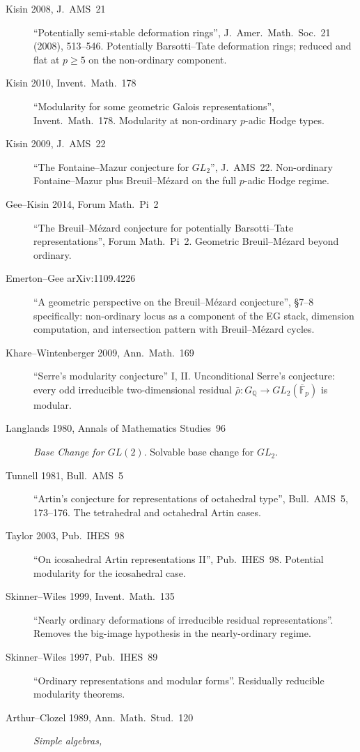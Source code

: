 \begin{description}
\item[Kisin 2008, J.~AMS~21] ``Potentially semi-stable deformation rings'',
J.~Amer.~Math.~Soc.~21 (2008), 513--546.
Potentially Barsotti--Tate deformation rings; reduced and flat at \(p\geq 5\) on
the non-ordinary component.
\item[Kisin 2010, Invent.~Math.~178] ``Modularity for some
geometric Galois representations'', Invent.~Math.~178. Modularity
at non-ordinary \(p\)-adic Hodge types.
\item[Kisin 2009, J.~AMS~22] ``The Fontaine--Mazur conjecture for
\(GL_{2}\)'', J.~AMS~22. Non-ordinary Fontaine--Mazur plus
Breuil--M{\'e}zard on the full \(p\)-adic Hodge regime.
\item[Gee--Kisin 2014, Forum Math.~Pi~2] ``The Breuil--M{\'e}zard
conjecture for potentially Barsotti--Tate representations'',
Forum Math.~Pi~2. Geometric Breuil--M{\'e}zard beyond ordinary.
\item[Emerton--Gee arXiv:1109.4226] ``A geometric perspective on
the Breuil--M{\'e}zard conjecture'', \S 7--8 specifically:
non-ordinary locus as a component of the EG stack, dimension
computation, and intersection pattern with Breuil--M{\'e}zard cycles.
\item[Khare--Wintenberger 2009, Ann.~Math.~169] ``Serre's modularity
conjecture'' I, II. Unconditional Serre's conjecture: every odd
irreducible two-dimensional residual \(\bar\rho\colon G_{\mathbb{Q}}\to
GL_{2}(\overline{\mathbb{F}}_{p})\) is modular.
\item[Langlands 1980, Annals of Mathematics Studies~96] \emph{Base
Change for \(GL(2)\)}. Solvable base change for \(GL_{2}\).
\item[Tunnell 1981, Bull.~AMS~5] ``Artin's conjecture for
representations of octahedral type'', Bull.~AMS~5, 173--176. The
tetrahedral and octahedral Artin cases.
\item[Taylor 2003, Pub.~IHES~98] ``On icosahedral Artin
representations II'', Pub.~IHES~98. Potential modularity for the
icosahedral case.
\item[Skinner--Wiles 1999, Invent.~Math.~135] ``Nearly ordinary
deformations of irreducible residual representations''. Removes the
big-image hypothesis in the nearly-ordinary regime.
\item[Skinner--Wiles 1997, Pub.~IHES~89] ``Ordinary representations
and modular forms''. Residually reducible modularity theorems.
\item[Arthur--Clozel 1989, Ann.~Math.~Stud.~120] \emph{Simple algebras,
}
\end{description}
